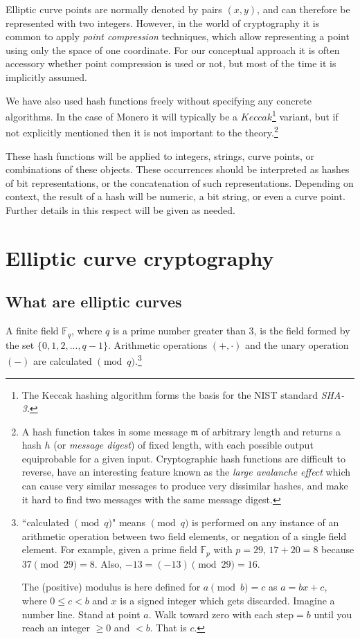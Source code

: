 Elliptic curve points are normally denoted by pairs \((x, y)\), and can therefore be represented with two integers. However, in the world of cryptography it is common to apply {\em point compression} techniques, which allow representing a point using only the space of one coordinate. For our conceptual approach it is often accessory whether point compression is used or not, but most of the time it is implicitly assumed.

We have also used hash functions freely without specifying any concrete algorithms. In the case of Monero it will typically be a \(\mathit{Keccak}\)\footnote{\label{kekkak_note}The Keccak hashing algorithm forms the basis
for the NIST standard {\em SHA-3}.} 
variant, but if not explicitly mentioned then it is not important to the theory.\footnote{\label{hash_note}A hash function takes in some message $\mathfrak{m}$ of arbitrary length and returns a hash $h$ (or {\em message digest}) of fixed length, with each possible output equiprobable for a given input. Cryptographic hash functions are difficult to reverse, have an interesting feature known as the {\em large avalanche effect} which can cause very similar messages to produce very dissimilar hashes, and make it hard to find two messages with the same message digest.}

These hash functions will be applied to integers, strings, curve points, or combinations of these objects. These occurrences should be interpreted as hashes of bit representations, or the concatenation of such representations. Depending on context, the result of a hash will be numeric, a bit string, or even a curve point. Further details in this respect will be given as needed.




\section{Elliptic curve cryptography}
\label{EllipticCurveCryptography}

\subsection{What are elliptic curves}
\label{elliptic_curves_section}


A finite field \(\mathbb{F}_q\), where \(q\) is a prime number greater than 3, is the field formed by the set \(\{0, 1, 2, ..., q-1\}\). Arithmetic operations \((+,  \cdot)\) and the unary operation $(-)$ are calculated \( \pmod q\).\footnote{\label{modulus_note}``calculated \( \pmod q\)" means \( \pmod q\) is performed on any instance of an arithmetic operation between two field elements, or negation of a single field element. For example, given a prime field \(\mathbb{F}_p\) with $p = 29$, $17+20=8$ because $37 \pmod{29} = 8$. Also, $-13 = (-13) \pmod{29} = 16$.

The (positive) modulus is here defined for $a \pmod b = c$ as $a=bx+c$, where $0\leq{c}<{b}$ and $x$ is a signed integer which gets discarded. Imagine a number line. Stand at point $a$. Walk toward zero with each $\text{step} =b$ until you reach an integer $\geq{0}$ and $<b$. That is $c$.}



